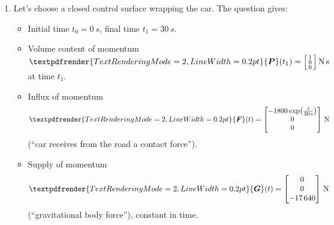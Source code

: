 \documentclass[a4paper,12pt,%
onecolumn,oneside,%
british%
]{memoir}
\renewcommand*{\bm}[1]{\textpdfrender{TextRenderingMode=2,LineWidth=0.2pt}{\boldsymbol{#1}}}
\renewcommand*{\|}[1][]{\nonscript\:#1\vert\nonscript\:\mathopen{}}
\newcommand*{\yti}{t_{0}}
\newcommand*{\ytf}{t_{1}}
\newcommand*{\yP}{\bm{P}}
\newcommand*{\yF}{\bm{F}}
\newcommand*{\yG}{\bm{G}}
\begin{document}
\begin{enumerate}[exerc]
\item  Let's choose a closed control surface wrapping the car. The question gives:
  \begin{itemize}[nosep]
  \item Initial time $\yti=\qty{0}{s}$, final time $\ytf= \qty{30}{s}$.
  \item Volume content of momentum $\yP(\ytf)=\begin{bsmallmatrix}
    1\\0\\0
  \end{bsmallmatrix}\,\unit{N\,s}$ at time $\ytf$.
\item Influx of momentum $$\yF(t) =
    \begin{bmatrix}
      -\num{1800}\exp\bigl(\frac{t}{\qty{20}{s}}\bigr)
      \\
      0
      \\
      0
    \end{bmatrix}\,\unit{N}$$ (\enquote{car receives from the road a contact force}).
\item Supply of momentum $$\yG(t) =
\begin{bmatrix}
    0
      \\
      0
      \\
      -\num{17640}
    \end{bmatrix}\,\unit{N}$$ (\enquote{gravitational body force}), constant in time.
  \end{itemize}


\end{enumerate}
\end{document}
